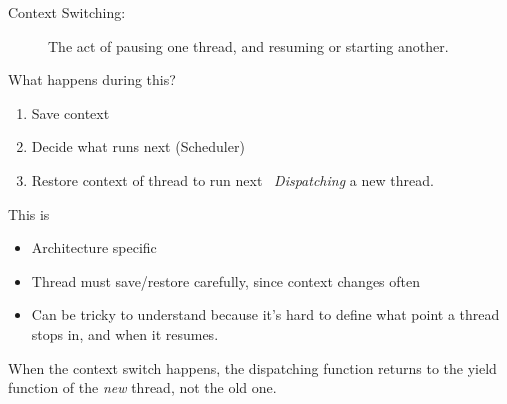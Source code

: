 \documentclass[12pt]{article}
\begin{document}
\begin{description}
    \item[Context Switching:] The act of pausing one thread, and resuming or
        starting another.
\end{description}

What happens during this?
\begin{enumerate}
    \item Save context
    \item Decide what runs next (Scheduler)
    \item Restore context of thread to run next \ie\ 
        \textit{Dispatching} a new thread.
\end{enumerate}

This is
\begin{itemize}
    \item Architecture specific
    \item Thread must save/restore carefully, since context changes often
    \item Can be tricky to understand because it's hard to define what point a
        thread stops in, and when it resumes.
\end{itemize}

When the context switch happens, the dispatching function returns to the yield
function of the \textit{new} thread, not the old one.
\end{document}
